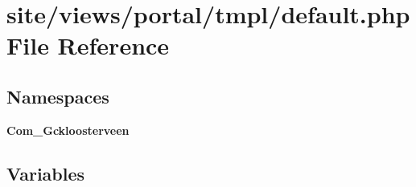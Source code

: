 \section{site/views/portal/tmpl/default.php File Reference}
\label{site_2views_2portal_2tmpl_2default_8php}
\subsection*{Namespaces}
\begin{DoxyCompactItemize}
\item 
 \textbf{ Com\+\_\+\+Gckloosterveen}
\end{DoxyCompactItemize}
\subsection*{Variables}
